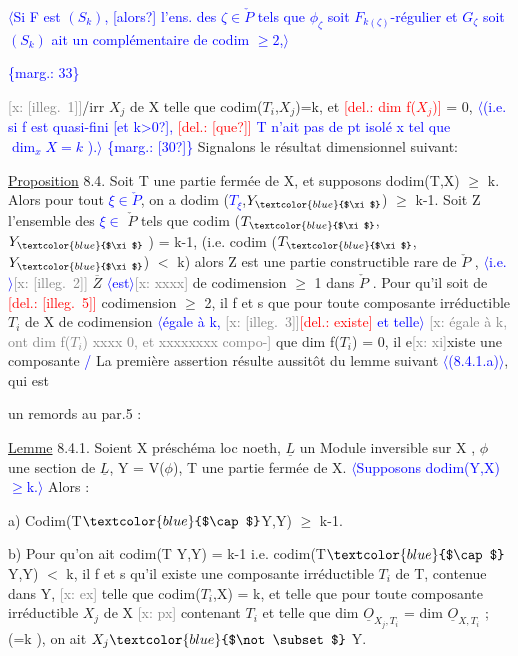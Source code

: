 \documentclass[11pt]{article}
\newcommand{\scanpage}[1]{\par\bigskip\noindent{\small\sffamily[scan #1]}\par}
\newcommand{\hand}[1]{\textcolor{blue}{#1}}
\newcommand{\inserted}[2][]{\textcolor{blue}{$\langle$#2$\rangle$}}
\newcommand{\margin}[1]{\textcolor{blue}{\{\textsf{marg.:} #1\}}}
\newcommand{\deleted}[1]{\textcolor{red}{[\textsf{del.:} #1]}}
\newcommand{\xout}[1]{\textcolor{gray}{[\textsf{x:} #1]}}
\newcommand{\uline}[1]{\underline{#1}}
\newcommand{\unsure}[1]{[#1?]}
\newcommand{\illegible}[1]{[\textsf{illeg.\ #1}]}
\begin{document}
\inserted{Si F est $(S_k)$, \unsure{alors} l'ens. des $\zeta\in\check{P}$ tels que $\phi_\zeta$ soit $F_{k(\zeta)}$-régulier et $G_\zeta$ soit $(S_k)$ ait un complémentaire de codim $\geq 2$,}

\margin{33}

\clearpage
\scanpage{25/34}
\xout{\illegible{1}}/irr $X_j$ de X telle que codim($T_i$,$X_j$)=k, et \deleted{dim f($X_j$)} = 0, \inserted{(i.e. si f est quasi-fini \unsure{et k>0}, \deleted{\unsure{que}} T n'ait pas de pt isolé x tel que $\dim_x X = k$ ).}
\margin{\unsure{30}}
Signalons le résultat dimensionnel suivant:

\uline{Proposition} 8.4. Soit T une partie fermée de X, et supposons
dodim(T,X) $\geq$ k. Alors pour tout \hand{$\xi\in\check{P}$}, on a dodim (\hand{$T_\xi$},$Y_{\hand{$\xi$}}$) $\geq$ k-1. Soit
Z l'ensemble des \hand{$\xi\in$} $\check{P}$ tels que codim ($T_{\hand{$\xi$}}$,$Y_{\hand{$\xi$}}$ ) = k-1, (i.e.
codim ($T_{\hand{$\xi$}}$,$Y_{\hand{$\xi$}}$) $<$ k) alors Z est une partie constructible rare de $\check{P}$ ,
\inserted[typed]{i.e.}\xout{\illegible{2}} $\overline{Z}$ \inserted[typed]{est}\xout{xxxx} de codimension $\geq$ 1 dans $\check{P}$ . Pour qu'il soit de
\deleted{\illegible{5}}
codimension $\geq$ 2, il f et s que pour toute composante irréductible
$T_i$ de X de codimension \inserted[typed]{égale à k, \xout{\illegible{3}}\deleted{existe} et telle} \xout{égale à k, ont dim f($T_i$) xxxx 0, et xxxxxxxx compo-}
que dim f($T_i$) = 0, il e\xout{xi}xiste une composante \hand{/}
La première assertion résulte aussitôt du lemme suivant \inserted[typed]{(8.4.1.a)}, qui est

un remords au par.5 :

\uline{Lemme} 8.4.1. Soient X préschéma loc noeth, $\underline{L}$ un Module inversible sur
X , $\phi$ une section de $\underline{L}$, Y = V($\phi$), T une partie fermée de X. \inserted[typed]{Supposons dodim(Y,X)$\geq$k.} Alors :

a) Codim(T$\hand{$\cap$}$Y,Y) $\geq$ k-1.

b) Pour qu'on ait codim(T Y,Y) = k-1 i.e. codim(T$\hand{$\cap$}$Y,Y) $<$ k, il
f et s qu'il existe une composante irréductible $T_i$ de T, contenue dans
Y, \xout{ex} telle que codim($T_i$,X) = k, et telle que pour toute composante
irréductible $X_j$ de X \xout{px} contenant $T_i$ et telle que dim $\underline{O}_{X_j,T_i}$ =
dim $\underline{O}_{X,T_i}$ ; (=k ), on ait $X_j \hand{$\not\subset$}$ Y.
\end{document}
